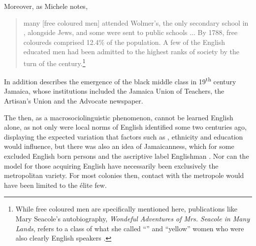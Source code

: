 \noindent Moreover, as Michele \citet[14]{Stewart2002} notes,

\begin{quote} many [free coloured men] attended Wolmer’s, the only secondary school in , alongside Jews, and some were sent to public schools ... By 1788, free coloureds comprised 12.4\% of the population.  A few of the English educated men had been admitted to the highest ranks of society by the turn of the century.\footnote{While free coloured men are specifically mentioned here, publications like Mary Seacole’s autobiography, \textit{Wondeful Adventures of Mrs. Seacole in Many Lands}, refers to a class of what she called “” and “yellow” women who were also clearly English speakers \citep{Busby1992}.}\end{quote}

In addition \citet{Bryan1996} describes the emergence of the black middle class in 19\textsuperscript{th} century Jamaica, whose institutions included the Jamaica Union of Teachers, the Artisan’s Union and the Advocate newspaper.  

The  then, as a macrosociolinguistic phenomenon, cannot be learned English alone, as not only were local norms of English identified some two centuries ago, displaying the expected variation that factors such as , ethnicity and education would influence, but there was also an idea of Jamaicanness, which for some excluded English born persons and the ascriptive label Englishman \citep[34]{Patterson1973}.  Nor can the model for those acquiring English have necessarily been exclusively the metropolitan variety. For most colonies then, contact with the metropole would have been limited to the élite few.  

